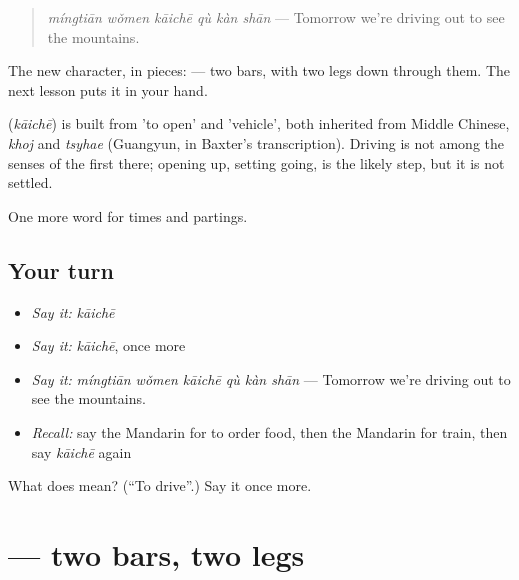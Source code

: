 \begin{quote}
\textbf{} \emph{míngtiān wǒmen kāichē qù kàn shān} — Tomorrow we're driving out to see the mountains.
\end{quote}

The new character, in pieces:  — two bars, with two legs down through them. The next lesson puts it in your hand.

\begin{cousinweb}
\textbf{} (\emph{kāichē}) is built from  'to open' and  'vehicle', both inherited from Middle Chinese, \emph{khoj} and \emph{tsyhae} (Guangyun, in Baxter's transcription). Driving is not among the senses of the first there; opening up, setting going, is the likely step, but it is not settled.
\end{cousinweb}

\begin{grammarlens}[title={What you've built}]
One more word for times and partings.
\end{grammarlens}

\subsection*{Your turn}
\begin{itemize}
\raggedright
  \item \emph{Say it:} \emph{kāichē}
  \item \emph{Say it:} \emph{kāichē}, once more
  \item \emph{Say it:} \emph{míngtiān wǒmen kāichē qù kàn shān} — Tomorrow we're driving out to see the mountains.
  \item \emph{Recall:} say the Mandarin for to order food, then the Mandarin for train, then say \emph{kāichē} again
\end{itemize}

\begin{tcolorbox}[breakable,colback=teal!4,colframe=teal!35!black,title={Before you move on}]
What does  mean? (\textquotedblleft{}To drive\textquotedblright{}.) Say it once more.
\end{tcolorbox}
\section[\texorpdfstring{\zh{开} (kāi)}{开 (kāi)}]{ — two bars, two legs}

\label{lesson:ZH-W72-kai}



